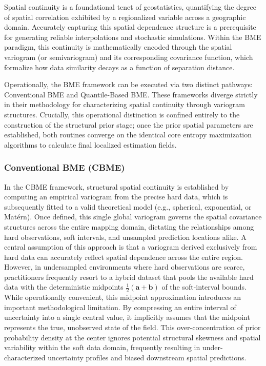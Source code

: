Spatial continuity is a foundational tenet of geostatistics, quantifying the degree of spatial correlation exhibited by a regionalized variable across a geographic domain. Accurately capturing this spatial dependence structure is a prerequisite for generating reliable interpolations and stochastic simulations. Within the BME paradigm, this continuity is mathematically encoded through the spatial variogram (or semivariogram) and its corresponding covariance function, which formalize how data similarity decays as a function of separation distance.

Operationally, the BME framework can be executed via two distinct pathways: Conventional BME and Quantile-Based BME. These frameworks diverge strictly in their methodology for characterizing spatial continuity through variogram structures. Crucially, this operational distinction is confined entirely to the construction of the structural prior stage; once the prior spatial parameters are established, both routines converge on the identical core entropy maximization algorithms to calculate final localized estimation fields.

\subsubsection{Conventional BME (CBME)}\label{conventional-bme-cbme}

In the CBME framework, structural spatial continuity is established by computing an empirical variogram from the precise hard data, which is subsequently fitted to a valid theoretical model (e.g., spherical, exponential, or Matérn). Once defined, this single global variogram governs the spatial covariance structures across the entire mapping domain, dictating the relationships among hard observations, soft intervals, and unsampled prediction locations alike. A central assumption of this approach is that a variogram derived exclusively from hard data can accurately reflect spatial dependence across the entire region. However, in undersampled environments where hard observations are scarce, practitioners frequently resort to a hybrid dataset that pools the available hard data with the deterministic midpoints \(\frac{1}{2}(\boldsymbol{a} + \boldsymbol{b})\) of the soft-interval bounds. While operationally convenient, this midpoint approximation introduces an important methodological limitation. By compressing an entire interval of uncertainty into a single central value, it implicitly assumes that the midpoint represents the true, unobserved state of the field. This over-concentration of prior probability density at the center ignores potential structural skewness and spatial variability within the soft data domain, frequently resulting in under-characterized uncertainty profiles and biased downstream spatial predictions.

